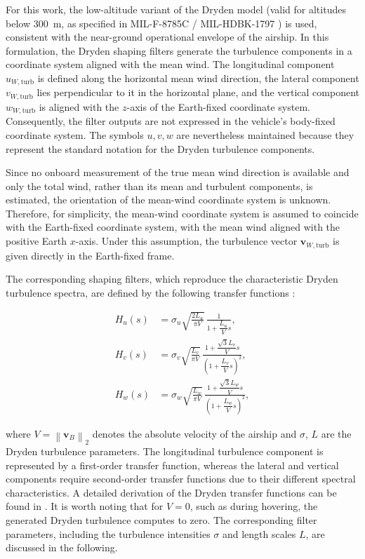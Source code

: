 For this work, the low-altitude variant of the Dryden model (valid for altitudes below \SI{300}{m}, as specified in MIL-F-8785C / MIL-HDBK-1797 \cite{MILF8785C, MILHDBK1797}) is used, consistent with the near-ground operational envelope of the airship. 
In this formulation, the Dryden shaping filters generate the turbulence components in a coordinate system aligned with the mean wind. The longitudinal component $u_{W, \mathrm{turb}}$ is defined along the horizontal mean wind direction, the lateral component $v_{W, \mathrm{turb}}$ lies perpendicular to it in the horizontal plane, and the vertical component $w_{W, \mathrm{turb}}$ is aligned with the $z$-axis of the Earth-fixed coordinate system.
Consequently, the filter outputs are not expressed in the vehicle's body-fixed coordinate system. The symbols $u, v, w$ are nevertheless maintained because they represent the standard notation for the Dryden turbulence components.

Since no onboard measurement of the true mean wind direction is available and only the total wind, rather than its mean and turbulent components, is estimated, the orientation of the mean-wind coordinate system is unknown. Therefore, for simplicity, the mean-wind coordinate system is assumed to coincide with the Earth-fixed coordinate system, with the mean wind aligned with the positive Earth $x$-axis. Under this assumption, the turbulence vector $\bm{v}_{W, \mathrm{turb}}$
is given directly in the Earth-fixed frame.

The corresponding shaping filters, which reproduce the characteristic Dryden turbulence spectra, are defined by the following transfer functions \cite{MILHDBK1797}:

\begin{align}
	H_u(s) &= \sigma_u \sqrt{\frac{2 L_u}{\pi V}} \, \frac{1}{1 + \dfrac{L_u}{V} s},
	\label{eq:Dryden_Hu}
	\\[6pt]
	H_v(s) &= \sigma_v \sqrt{\frac{L_v}{\pi V}} \, \frac{1 + \dfrac{\sqrt{3} L_v}{V} s}{\left(1 + \dfrac{L_v}{V} s\right)^2}, 
	\label{eq:Dryden_Hv}
	\\[6pt]
	H_w(s) &= \sigma_w \sqrt{\frac{L_w}{\pi V}} \, \frac{1 + \dfrac{\sqrt{3} L_w}{V} s}{\left(1 + \dfrac{L_w}{V} s\right)^2},
	\label{eq:Dryden_Hw}
\end{align}

where $V = \left\|\bm{v}_B\right\|_2$ denotes the absolute velocity of the airship and $\sigma$, $L$ are the Dryden turbulence parameters.
The longitudinal turbulence component is represented by a first-order transfer function, whereas the lateral and vertical components require second-order transfer functions due to their different spectral characteristics. A detailed derivation of the Dryden transfer functions can be found in \cite{MILHDBK1797, Yeager1998Turbulence}. It is worth noting that for $V = 0$, such as during hovering, the generated Dryden turbulence computes to zero.
The corresponding filter parameters, including the turbulence intensities $\sigma$ and length scales $L$, are discussed in the following.





